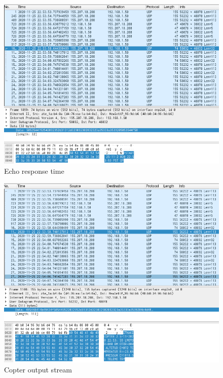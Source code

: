 \documentclass[12pt, a4paper]{article}
\begin{document}
\pagebreak
\begin{figure}[h!]
\centering
	\includegraphics[height=.4\textheight, width=\textwidth, keepaspectratio]{assets/wireshark/copter2.png}
	\caption{Echo response time} 
\end{figure}

\begin{figure}[h!]
\centering
	\includegraphics[height=.4\textheight, width=\textwidth, keepaspectratio]{assets/wireshark/copter3.png}
	\caption{Copter output stream} 
\end{figure}

\pagebreak
\end{document}

